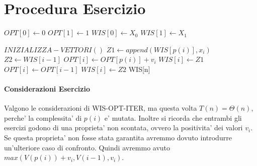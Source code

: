 \section{Procedura Esercizio}

\begin{algorithm}
    \begin{algorithmic}
            \State $OPT[0] \gets 0$
            \State $OPT[1] \gets 1$
            \State $WIS[0] \gets X_0$
            \State $WIS[1] \gets X_1$
        \EndProcedure
    \end{algorithmic}
\end{algorithm}

\begin{algorithm}
    \begin{algorithmic}
            \State $INIZIALIZZA-VETTORI()$
                \State $Z1 \gets append(WIS[p(i)], x_i)$
                \State $Z2 \gets WIS[i-1]$
                    \State $OPT[i] \gets OPT[p(i)] + v_i$
                    \State $WIS[i] \gets Z1$
                \Else
                    \State $OPT[i] \gets OPT[i-1]$
                    \State $WIS[i] \gets Z2$
                \EndIf
            \EndFor
            \State \Return WIS[n]
        \EndProcedure
    \end{algorithmic}
\end{algorithm}

\paragraph{Considerazioni Esercizio}

Valgono le considerazioni di WIS-OPT-ITER, ma questa volta $T(n) = \Theta(n)$, perche' la complessita' di $p(i)$ e' mutata.
Inoltre si ricorda che entrambi gli esercizi godono di una proprieta' non scontata, ovvero la positivita' dei valori $v_i$.
Se questa proprieta' non fosse stata garantita avremmo dovuto introdurre un'ulteriore caso di confronto.
Quindi avremmo avuto $max(V(p(i)) + v_i, V(i-1), v_i)$.